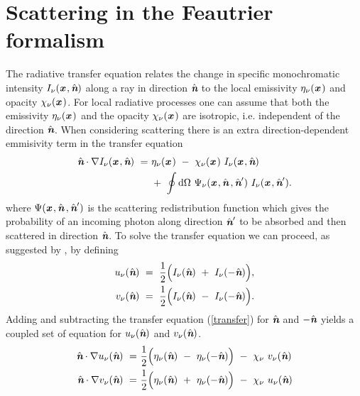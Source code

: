 \documentclass[a4paper,fleqn,usenatbib]{mnras}
\newcommand{\D}{\text{d}}
\newcommand{\x}{{\textit{\textbf{x}}}\,}
\newcommand{\n}{\hat{\textit{\textbf{n}}}}
\begin{document}
\section{Scattering in the Feautrier formalism}
\label{Scattering}

The radiative transfer equation relates the change in specific monochromatic intensity $I_{\nu}(\x,\n)$ along a ray in direction $\n$ to the local emissivity $\eta_{\nu}(\x)$ and opacity $\chi_{\nu}(\x)$. For local radiative processes one can assume that both the emissivity $\eta_{\nu}(\x)$ and the opacity $\chi_{\nu}(\x)$ are isotropic, i.e. independent of the direction $\n$. When considering scattering \citep[see e.g.][]{Chandrasekhar1960,Steinacker2013} there is an extra direction-dependent emmisivity term in the transfer equation
\begin{equation}
\begin{split}
	\n \cdot \nabla I_{\nu}(\x,\n) \ = & \ \eta_{\nu}(\x) \ - \ \chi_{\nu}(\x) \ I_{\nu}(\x,\n) \\ & \ + \ \oint \D\Omega \ \Psi_{\nu}(\x, \n \, ,\n') \ I_{\nu}(\x,\n').
\label{transfer}
\end{split}
\end{equation}
where $\Psi(\x, \n \, ,\n')$ is the scattering redistribution function which gives the probability of an incoming photon along direction $\n'$ to be absorbed and then scattered in direction $\n$. To solve the transfer equation we can proceed, as suggested by \citet{Feautrier1964}, by defining
\begin{equation}
\begin{split}
		u_{\nu}(\n) \ &= \ \frac{1}{2}\Big( I_{\nu}(\n) \ + \ I_{\nu}(-\n) \Big), \\
		v_{\nu}(\n) \ &= \ \frac{1}{2}\Big( I_{\nu}(\n) \ - \ I_{\nu}(-\n) \Big).
\end{split}
\end{equation}
Adding and subtracting the transfer equation (\ref{transfer}) for $\n$ and $-\n$ yields a coupled set of equation for $u_{\nu}(\n)$ and $v_{\nu}(\n)$.
\begin{equation}
\begin{split}
		\n \cdot \nabla u_{\nu}(\n) \ = \ & \frac{1}{2}\Big( \eta_{\nu}(\n)
		\ - \ \eta_{\nu}(-\n) \Big) \ - \ \chi_{\nu} \ v_{\nu}(\n) \\
		\n \cdot \nabla v_{\nu}(\n) \ = \ & \frac{1}{2}\Big( \eta_{\nu}(\n)
		\ + \ \eta_{\nu}(-\n) \Big) \ - \ \chi_{\nu} \ u_{\nu}(\n)
\end{split}
\label{uv}
\end{equation}
\end{document}
